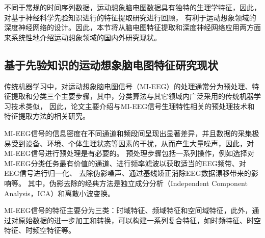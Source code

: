 不同于常规的时间序列数据，运动想象脑电图数据具有独特的生理学特征，因此，对基于神经科学先验知识进行的特征提取研究进行回顾，
有利于运动想象领域的深度神经网络的设计。因此，本节将从脑电图特征提取和深度神经网络应用两方面来系统性地介绍运动想象领域的国内外研究现状。

\subsection{基于先验知识的运动想象脑电图特征研究现状}

传统机器学习中，对运动想象脑电图信号（MI-EEG）的处理通常分为预处理、特征提取和分类三个主要步骤\cite{altaheri2023deep}，其中，分类算法与其它领域内广泛采用的传统机器学习技术类似，
因此，论文主要介绍与MI-EEG信号生理特性相关的预处理技术和特征提取方法的相关研究。

MI-EEG信号的信息密度在不同通道和频段间呈现出显著差异，并且数据的采集极易受到设备、环境、个体生理状态等因素的干扰，从而产生大量噪声，因此，对MI-EEG信号进行预处理是有必要的。
预处理步骤包括一系列操作，例如选择对MI-EEG分类任务最有价值的通道、进行频率滤波以获取适当的EEG频带、对EEG信号进行归一化、
去除伪影噪声\cite{altaheri2023deep}、通过基线矫正消除EEG数据漂移带来的影响等。
其中，伪影去除的经典方法是独立成分分析（Independent Component Analysis，ICA）和离散小波变换\cite{sai2017automated}。

MI-EEG信号的特征主要分为三类：时域特征、频域特征和空间域特征\cite{altaheri2023deep}，此外，通过对原始数据的进一步加工和转换，可以构建一系列复合特征，如时频特征、时空特征、时频空特征等。

